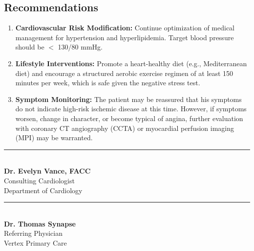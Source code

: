 \subsection{Recommendations}
\begin{enumerate}[label=\arabic*.]
    \item \textbf{Cardiovascular Risk Modification:} Continue optimization of medical management for hypertension and hyperlipidemia. Target blood pressure should be $<$ 130/80 mmHg.
    \item \textbf{Lifestyle Interventions:} Promote a heart-healthy diet (e.g., Mediterranean diet) and encourage a structured aerobic exercise regimen of at least 150 minutes per week, which is safe given the negative stress test.
    \item \textbf{Symptom Monitoring:} The patient may be reassured that his symptoms do not indicate high-risk ischemic disease at this time. However, if symptoms worsen, change in character, or become typical of angina, further evaluation with coronary CT angiography (CCTA) or myocardial perfusion imaging (MPI) may be warranted.
\end{enumerate}

\vspace{0.8cm}

\noindent
\begin{minipage}[t]{0.5\textwidth}
    \centering
    {\color{MedGray}\rule{0.8\textwidth}{0.5pt}} \\
    \vspace{0.15cm}
    \textbf{Dr. Evelyn Vance, FACC} \\
    {\color{MedGray}\small Consulting Cardiologist} \\
    {\color{MedGray}\small Department of Cardiology}
\end{minipage}
\begin{minipage}[t]{0.5\textwidth}
    \centering
    {\color{MedGray}\rule{0.8\textwidth}{0.5pt}} \\
    \vspace{0.15cm}
    \textbf{Dr. Thomas Synapse} \\
    {\color{MedGray}\small Referring Physician} \\
    {\color{MedGray}\small Vertex Primary Care}
\end{minipage}
